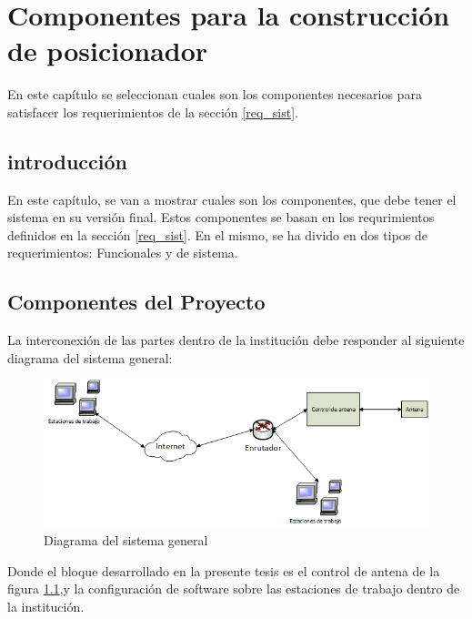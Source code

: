 \renewcommand{\chaptername}{Componentes para la construcción de posicionador}
\chapter{Componentes para la construcción de posicionador} 
\begin{center}
\begin{tcolorbox}[colback=gray!5!white, %
colframe=gray!75!black,
title= \center{\Large{resumen}} ]
En este capítulo se seleccionan cuales son los componentes necesarios para satisfacer los requerimientos de la sección \ref{req_sist}.   
\end{tcolorbox}
\end{center}    
\section{introducción}

En este capítulo, se van a mostrar cuales son los componentes, que debe tener el sistema en su versión final. Estos componentes se basan en los requrimientos definidos en la sección \ref{req_sist}. En el mismo, se ha divido en dos tipos de requerimientos: Funcionales y de sistema. 

\section{Componentes del Proyecto}

La interconexión de las partes dentro de la institución debe responder al siguiente diagrama del sistema general: 
\begin{figure}[ht]	
	\centering
	\includegraphics[scale=0.8]{parte_1/cap2/ssgen}
	\caption{Diagrama del sistema general}
	\label{fig:fig_ssgen}
\end{figure}


Donde el bloque desarrollado en la presente tesis es el control de antena de la figura \ref{fig:fig_ssgen},y la configuración de software sobre las estaciones de trabajo dentro de la institución. 

